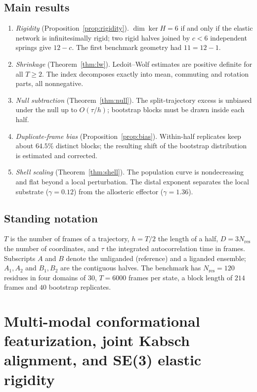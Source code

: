 \documentclass[11pt,reqno]{amsart}
\theoremstyle{plain}
\theoremstyle{definition}
\theoremstyle{remark}
\numberwithin{equation}{section}
\begin{document}
\subsection*{Main results}
\begin{enumerate}[label=(\arabic*),leftmargin=*]
\item \emph{Rigidity} (Proposition~\ref{prop:rigidity}). $\dim\ker H=6$ if and only if the elastic network is infinitesimally rigid; two rigid halves joined by $c<6$ independent springs give $12-c$. The first benchmark geometry had $11=12-1$.
\item \emph{Shrinkage} (Theorem~\ref{thm:lw}). Ledoit--Wolf estimates are positive definite for all $T\ge2$. The index decomposes exactly into mean, commuting and rotation parts, all nonnegative.
\item \emph{Null subtraction} (Theorem~\ref{thm:null}). The split-trajectory excess is unbiased under the null up to $O(\tau/h)$; bootstrap blocks must be drawn inside each half.
\item \emph{Duplicate-frame bias} (Proposition~\ref{prop:bias}). Within-half replicates keep about $64.5\%$ distinct blocks; the resulting shift of the bootstrap distribution is estimated and corrected.
\item \emph{Shell scaling} (Theorem~\ref{thm:shell}). The population curve is nondecreasing and flat beyond a local perturbation. The distal exponent separates the local substrate ($\gamma=0.12$) from the allosteric effector ($\gamma=1.36$).
\end{enumerate}

\subsection*{Standing notation}
$T$ is the number of frames of a trajectory, $h=T/2$ the length of a half, $D=3N_{\mathrm{res}}$ the number of coordinates, and $\tau$ the integrated autocorrelation time in frames. Subscripts $A$ and $B$ denote the unliganded (reference) and a liganded ensemble; $A_1,A_2$ and $B_1,B_2$ are the contiguous halves. The benchmark has $N_{\mathrm{res}}=120$ residues in four domains of $30$, $T=6000$ frames per state, a block length of $214$ frames and $40$ bootstrap replicates.

\section{Multi-modal conformational featurization, joint Kabsch alignment, and SE(3) elastic rigidity}
\label{sec:featurize}
\end{document}
